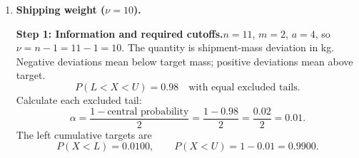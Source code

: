 \begin{enumerate}[leftmargin=*,label=\textbf{\arabic*.},itemsep=12pt,parsep=3pt,topsep=5pt]
\par\noindent\begin{minipage}{\linewidth}
\par\textbf{Step 7: Interpretation.}\nopagebreak\enspace The alert limits are $(-6.58,5.92)$ minutes under $t$ and $(-5.92,4.88)$ minutes under normal. Approximately $5\%$ of journeys are earlier than the lower limit and $2.5\%$ are later than the upper limit, leaving $92.5\%$ between each model's limits. Normal moves the early limit toward the mean by $0.66$ minutes and the late limit toward the mean by about $1.04$ minutes.
\end{minipage}\par
\item \begin{minipage}[t]{\linewidth}\textbf{Shipping weight ($\nu=10$).}\nopagebreak
\par\textbf{Step 1: Information and required cutoffs.}\nopagebreak\enspace $n=11$, $m=2$, $a=4$, so $\nu=n-1=11-1=10$. The quantity is shipment-mass deviation in kg. Negative deviations mean below target mass; positive deviations mean above target.\[
P(L<X<U)=0.98\quad\text{with equal excluded tails}.
\]
Calculate each excluded tail:\[
\alpha=\frac{1-\text{central probability}}{2}=\frac{1-0.98}{2}=\frac{0.02}{2}=0.01.
\]
The left cumulative targets are\[
P(X<L)=0.0100,\qquad P(X<U)=1-0.01=0.9900.
\]


\end{minipage}
\end{enumerate}
